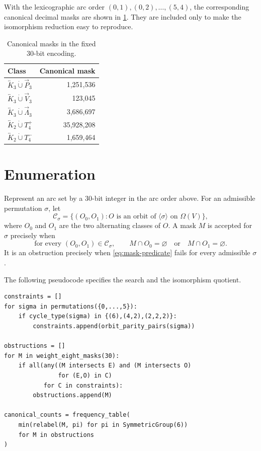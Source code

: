 \documentclass[11pt,reqno]{amsart}
\theoremstyle{definition}
\newcommand{\bK}[1]{\overleftrightarrow{K}_{#1}}
\newcommand{\dP}{\overrightarrow{P}_{3}}
\newcommand{\dV}{\overrightarrow{V}_{3}}
\newcommand{\dL}{\overrightarrow{\Lambda}_{3}}
\newcommand{\dunion}{\mathbin{\dot\cup}}
\begin{document}
With the lexicographic arc order \((0,1),(0,2),\ldots,(5,4)\), the corresponding canonical decimal masks are shown in \cref{tab:canonical-masks}. They are included only to make the isomorphism reduction easy to reproduce.

\begin{table}[ht]
\caption{Canonical masks in the fixed \(30\)-bit encoding.}
\label{tab:canonical-masks}
\centering
\small
\begin{tabular}{@{}lr@{}}
\toprule
Class & Canonical mask \\
\midrule
\(\bK{3}\dunion\dP\) & 1,251,536 \\
\(\bK{3}\dunion\dV\) & 123,045 \\
\(\bK{3}\dunion\dL\) & 3,686,697 \\
\(\bK{2}\dunion T_4^+\) & 35,928,208 \\
\(\bK{2}\dunion T_4^-\) & 1,659,464 \\
\bottomrule
\end{tabular}
\end{table}

\section{Enumeration}\label{app:enumeration}

Represent an arc set by a \(30\)-bit integer in the arc order above. For an admissible permutation \(\sigma\), let
\[
\mathcal C_\sigma=\{(O_0,O_1):O\text{ is an orbit of }\langle\sigma\rangle\text{ on }\Omega(V)\},
\]
where \(O_0\) and \(O_1\) are the two alternating classes of \(O\). A mask \(M\) is accepted for \(\sigma\) precisely when
\begin{equation}\label{eq:mask-predicate}
\text{for every }(O_0,O_1)\in\mathcal C_\sigma,
\qquad
M\cap O_0=\varnothing\quad\text{or}\quad M\cap O_1=\varnothing.
\end{equation}
It is an obstruction precisely when \eqref{eq:mask-predicate} fails for every admissible \(\sigma\).

The following pseudocode specifies the search and the isomorphism quotient.

\begingroup
\footnotesize
\begin{verbatim}
constraints = []
for sigma in permutations({0,...,5}):
    if cycle_type(sigma) in {(6),(4,2),(2,2,2)}:
        constraints.append(orbit_parity_pairs(sigma))

obstructions = []
for M in weight_eight_masks(30):
    if all(any((M intersects E) and (M intersects O)
               for (E,O) in C)
           for C in constraints):
        obstructions.append(M)

canonical_counts = frequency_table(
    min(relabel(M, pi) for pi in SymmetricGroup(6))
    for M in obstructions
)
\end{verbatim}
\endgroup
\end{document}
